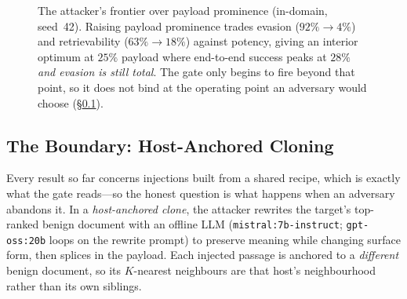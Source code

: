 \documentclass[10pt,journal,compsoc]{IEEEtran}
\begin{document}
\begin{figure}[t]
\centering
{}
\caption{The attacker's frontier over payload prominence (in-domain, seed~42). Raising payload
prominence trades evasion ($92\%\!\to\!4\%$) and retrievability ($63\%\!\to\!18\%$) against
potency, giving an interior optimum at $25\%$ payload where end-to-end success peaks at $28\%$
\emph{and evasion is still total}. The gate only begins to fire beyond that point, so it does
not bind at the operating point an adversary would choose (\S\ref{subsec:boundary}).}
\label{fig:frontier}
\end{figure}

\subsection{The Boundary: Host-Anchored Cloning}
\label{subsec:boundary}
Every result so far concerns injections built from a shared recipe, which is exactly what the
gate reads---so the honest question is what happens when an adversary abandons it. In a
\emph{host-anchored clone}, the attacker rewrites the target's top-ranked benign document with an
offline LLM (\texttt{mistral:7b-instruct}; \texttt{gpt-oss:20b} loops on the rewrite prompt) to
preserve meaning while changing surface form, then splices in the payload. Each
injected passage is anchored to a \emph{different} benign document, so its $K$-nearest
neighbours are that host's neighbourhood rather than its own siblings.
\end{document}
